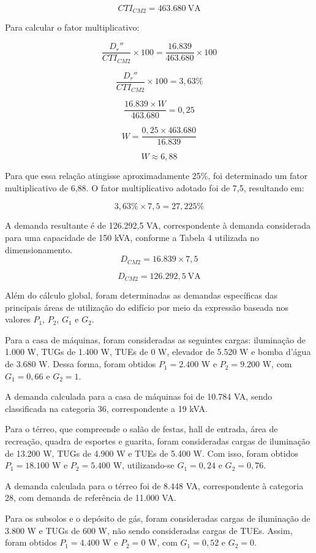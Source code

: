 \documentclass[12pt,openright,oneside,a4paper,brazil]{abntex2}
\begin{document}
\[
CTI_{CM2} = 463.680\ \mathrm{VA}
\]

Para calcular o fator multiplicativo:

\[
\frac{D_r''}{CTI_{CM2}} \times 100
=
\frac{16.839}{463.680} \times 100
\]

\[
\frac{D_r''}{CTI_{CM2}} \times 100
=
3,63\%
\]

\[
\frac{16.839 \times W}{463.680} = 0,25
\]

\[
W =
\frac{0,25 \times 463.680}{16.839}
\]

\[
W \approx 6,88
\]

Para que essa relação atingisse aproximadamente 25\%, foi determinado um fator multiplicativo de 6,88. O fator multiplicativo adotado foi de 7,5, resultando em:

\[
3,63\% \times 7,5 = 27,225\%
\]

A demanda resultante é de 126.292,5 VA, correspondente à demanda considerada para uma capacidade de 150 kVA, conforme a Tabela 4 utilizada no dimensionamento.
\[
D_{CM2} = 16.839 \times 7,5
\]

\[
D_{CM2} = 126.292,5\ \mathrm{VA}
\]

Além do cálculo global, foram determinadas as demandas específicas das principais áreas de utilização do edifício por meio da expressão baseada nos valores $P_1$, $P_2$, $G_1$ e $G_2$.

Para a casa de máquinas, foram consideradas as seguintes cargas: iluminação de 1.000 W, TUGs de 1.400 W, TUEs de 0 W, elevador de 5.520 W e bomba d'água de 3.680 W. Dessa forma, foram obtidos $P_1=2.400$ W e $P_2=9.200$ W, com $G_1=0,66$ e $G_2=1$.

A demanda calculada para a casa de máquinas foi de 10.784 VA, sendo classificada na categoria 36, correspondente a 19 kVA.

Para o térreo, que compreende o salão de festas, hall de entrada, área de recreação, quadra de esportes e guarita, foram consideradas cargas de iluminação de 13.200 W, TUGs de 4.900 W e TUEs de 5.400 W. Com isso, foram obtidos $P_1=18.100$ W e $P_2=5.400$ W, utilizando-se $G_1=0,24$ e $G_2=0,76$.

A demanda calculada para o térreo foi de 8.448 VA, correspondente à categoria 28, com demanda de referência de 11.000 VA.

Para os subsolos e o depósito de gás, foram consideradas cargas de iluminação de 3.800 W e TUGs de 600 W, não sendo consideradas cargas de TUEs. Assim, foram obtidos $P_1=4.400$ W e $P_2=0$ W, com $G_1=0,52$ e $G_2=0$.
\end{document}
